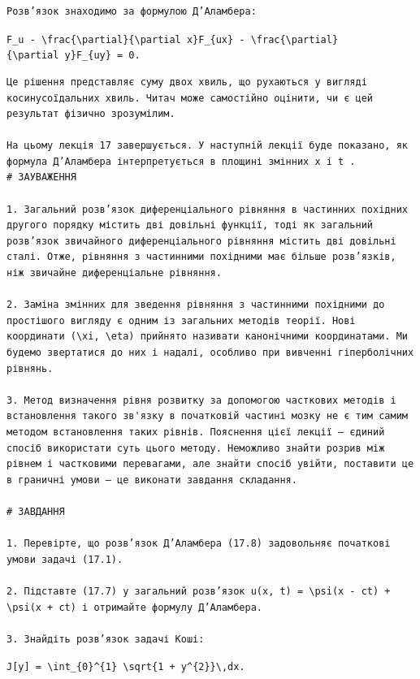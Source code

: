 \documentclass[
  ukrainian,
]{article}
\begin{document}
\begin{verbatim}
Розв’язок знаходимо за формулою Д’Аламбера:
\end{verbatim}

\texttt{F\_u\ -\ \textbackslash{}frac\{\textbackslash{}partial\}\{\textbackslash{}partial\ x\}F\_\{ux\}\ -\ \textbackslash{}frac\{\textbackslash{}partial\}\{\textbackslash{}partial\ y\}F\_\{uy\}\ =\ 0.}

\begin{verbatim}
Це рішення представляє суму двох хвиль, що рухаються у вигляді косинусоїдальних хвиль. Читач може самостійно оцінити, чи є цей результат фізично зрозумілим.

На цьому лекція 17 завершується. У наступній лекції буде показано, як формула Д’Аламбера інтерпретується в площині змінних x і t .
# ЗАУВАЖЕННЯ

1. Загальний розв’язок диференціального рівняння в частинних похідних другого порядку містить дві довільні функції, тоді як загальний розв’язок звичайного диференціального рівняння містить дві довільні сталі. Отже, рівняння з частинними похідними має більше розв’язків, ніж звичайне диференціальне рівняння.

2. Заміна змінних для зведення рівняння з частинними похідними до простішого вигляду є одним із загальних методів теорії. Нові координати (\xi, \eta) прийнято називати канонічними координатами. Ми будемо звертатися до них і надалі, особливо при вивченні гіперболічних рівнянь.

3. Метод визначення рівня розвитку за допомогою часткових методів і встановлення такого зв'язку в початковій частині мозку не є тим самим методом встановлення таких рівнів. Пояснення цієї лекції — єдиний спосіб використати суть цього методу. Неможливо знайти розрив між рівнем і частковими перевагами, але знайти спосіб увійти, поставити це в граничні умови — це виконати завдання складання.

# ЗАВДАННЯ

1. Перевірте, що розв’язок Д’Аламбера (17.8) задовольняє початкові умови задачі (17.1).

2. Підставте (17.7) у загальний розв’язок u(x, t) = \psi(x - ct) + \psi(x + ct) і отримайте формулу Д’Аламбера.

3. Знайдіть розв’язок задачі Коші:
\end{verbatim}

\texttt{J{[}y{]}\ =\ \textbackslash{}int\_\{0\}\^{}\{1\}\ \textbackslash{}sqrt\{1\ +\ y\textquotesingle{}\^{}\{2\}\}\textbackslash{},dx.}
\end{document}
